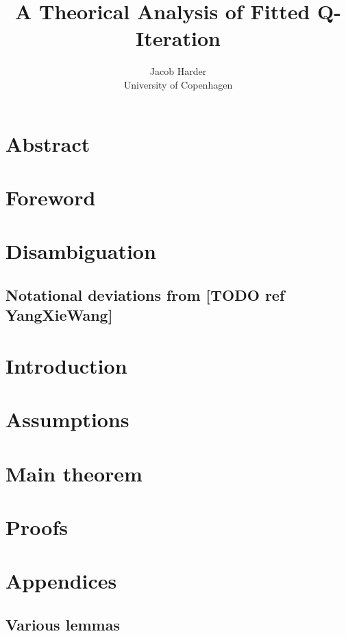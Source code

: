 \documentclass{article}
\title{A Theorical Analysis of Fitted Q-Iteration}
\author{Jacob Harder \\ University of Copenhagen}
\begin{document}
\maketitle

\section{Abstract}

\section{Foreword}


\section{Disambiguation}


\subsection{Notational deviations from [TODO ref YangXieWang]}


\section{Introduction}


\section{Assumptions}


\section{Main theorem}


\section{Proofs}











\section{Appendices}
\subsection{Various lemmas}


\end{document}
